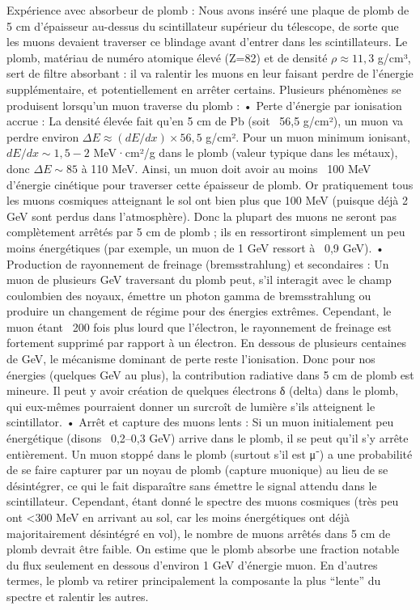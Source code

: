 \documentclass[a4paper,12pt,twoside]{article}
\begin{document}
Expérience avec absorbeur de plomb : Nous avons inséré une plaque de plomb de 5 cm d’épaisseur au-dessus du scintillateur supérieur du télescope, de sorte que les muons devaient traverser ce blindage avant d’entrer dans les scintillateurs. Le plomb, matériau de numéro atomique élevé (Z=82) et de densité $\rho \approx 11,3$ g/cm³, sert de filtre absorbant : il va ralentir les muons en leur faisant perdre de l’énergie supplémentaire, et potentiellement en arrêter certains. Plusieurs phénomènes se produisent lorsqu’un muon traverse du plomb :
	•	Perte d’énergie par ionisation accrue : La densité élevée fait qu’en 5 cm de Pb (soit ~56,5 g/cm²), un muon va perdre environ $\Delta E \approx (dE/dx) \times 56,5$ g/cm². Pour un muon minimum ionisant, $dE/dx \sim 1,5 - 2$ MeV·cm²/g dans le plomb (valeur typique dans les métaux), donc $\Delta E \sim 85$ à 110 MeV. Ainsi, un muon doit avoir au moins ~100 MeV d’énergie cinétique pour traverser cette épaisseur de plomb. Or pratiquement tous les muons cosmiques atteignant le sol ont bien plus que 100 MeV (puisque déjà 2 GeV sont perdus dans l’atmosphère). Donc la plupart des muons ne seront pas complètement arrêtés par 5 cm de plomb ; ils en ressortiront simplement un peu moins énergétiques (par exemple, un muon de 1 GeV ressort à ~0,9 GeV).
	•	Production de rayonnement de freinage (bremsstrahlung) et secondaires : Un muon de plusieurs GeV traversant du plomb peut, s’il interagit avec le champ coulombien des noyaux, émettre un photon gamma de bremsstrahlung ou produire un changement de régime pour des énergies extrêmes. Cependant, le muon étant ~200 fois plus lourd que l’électron, le rayonnement de freinage est fortement supprimé par rapport à un électron. En dessous de plusieurs centaines de GeV, le mécanisme dominant de perte reste l’ionisation. Donc pour nos énergies (quelques GeV au plus), la contribution radiative dans 5 cm de plomb est mineure. Il peut y avoir création de quelques électrons δ (delta) dans le plomb, qui eux-mêmes pourraient donner un surcroît de lumière s’ils atteignent le scintillator.
	•	Arrêt et capture des muons lents : Si un muon initialement peu énergétique (disons ~0,2–0,3 GeV) arrive dans le plomb, il se peut qu’il s’y arrête entièrement. Un muon stoppé dans le plomb (surtout s’il est μ⁻) a une probabilité de se faire capturer par un noyau de plomb (capture muonique) au lieu de se désintégrer, ce qui le fait disparaître sans émettre le signal attendu dans le scintillateur. Cependant, étant donné le spectre des muons cosmiques (très peu ont <300 MeV en arrivant au sol, car les moins énergétiques ont déjà majoritairement désintégré en vol), le nombre de muons arrêtés dans 5 cm de plomb devrait être faible. On estime que le plomb absorbe une fraction notable du flux seulement en dessous d’environ 1 GeV d’énergie muon. En d’autres termes, le plomb va retirer principalement la composante la plus “lente” du spectre et ralentir les autres.
\end{document}

